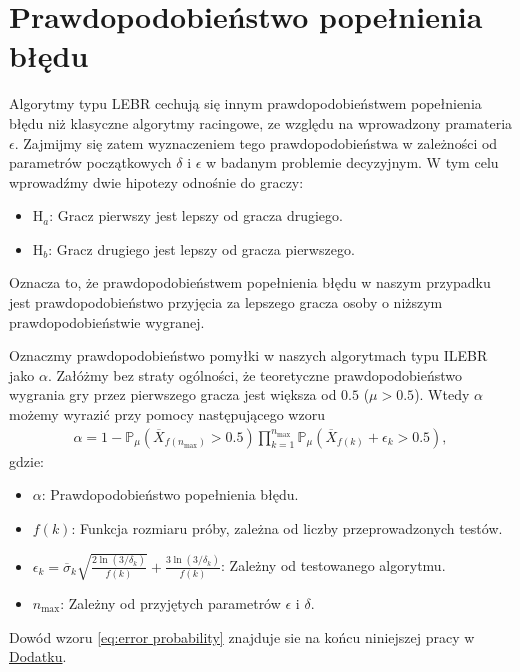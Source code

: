 \documentclass[inzynierska]{pwr_wmat_praca_dyplomowa}
\theoremstyle{plain}
\numberwithin{theorem}{chapter}
\theoremstyle{definition}
\numberwithin{theorem}{chapter}
\newcommand{\probP}{\mathbb{P}}
\newcommand{\nmax}{n_{\text{max}}}
\begin{document}
	\section{Prawdopodobieństwo popełnienia błędu}
		Algorytmy typu LEBR cechują się innym prawdopodobieństwem popełnienia błędu niż klasyczne algorytmy racingowe, ze względu na wprowadzony pramateria $\epsilon$. Zajmijmy się zatem wyznaczeniem tego prawdopodobieństwa w zależności od parametrów początkowych $\delta$ i $\epsilon$ w badanym problemie decyzyjnym. W tym celu wprowadźmy dwie hipotezy odnośnie do graczy:
	\begin{itemize}
		\item $\text{H}_a$: Gracz pierwszy jest lepszy od gracza drugiego.
		\item  $\text{H}_b$: Gracz drugiego jest lepszy od gracza pierwszego.
	\end{itemize}
	Oznacza to, że prawdopodobieństwem popełnienia błędu w naszym przypadku jest prawdopodobieństwo przyjęcia za lepszego gracza osoby o niższym prawdopodobieństwie wygranej. 
	
	Oznaczmy prawdopodobieństwo pomyłki w naszych algorytmach typu ILEBR jako $\alpha$. Załóżmy bez straty ogólności, że teoretyczne prawdopodobieństwo wygrania gry przez pierwszego gracza jest większa od $0.5$ ($\mu > 0.5$).  Wtedy $\alpha$ możemy wyrazić przy pomocy następującego wzoru
	\begin{gather}
		\label{eq:error probability}
		\alpha = 1 - \probP_{\mu}(\overline{X}_{f(\nmax)} > 0.5)
 \prod^{\nmax}_{k=1} \probP_{\mu}(\overline{X}_{f(k)} +  \epsilon_{k} > 0.5),
	\end{gather}
	gdzie:
	\begin{itemize}
		\item $\alpha$: Prawdopodobieństwo popełnienia błędu.
		\item $f(k)$: Funkcja rozmiaru próby, zależna od liczby przeprowadzonych testów.
		\item $\epsilon_k = \overline{\sigma}_k \sqrt{\frac{2\ln(3/\delta_k)}{f(k)}}+\frac{3\ln(3/\delta_k)}{f(k)}$: Zależny od testowanego algorytmu.
		\item $\nmax$: Zależny od przyjętych parametrów $\epsilon$ i $\delta$.
	\end{itemize}
	Dowód wzoru \eqref{eq:error probability} znajduje sie na końcu niniejszej pracy w \hyperref[proof:error probability]{Dodatku}.
	
\end{document}
